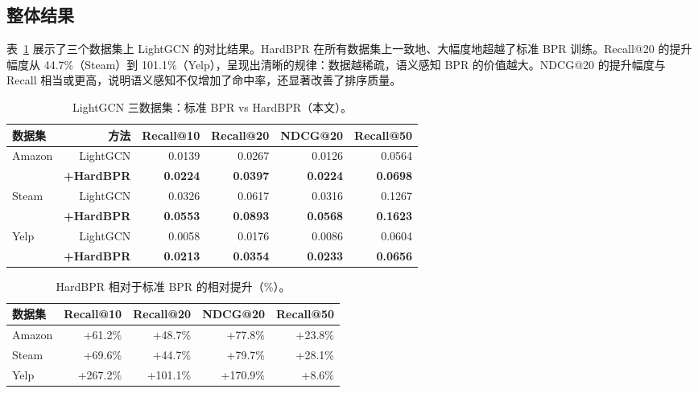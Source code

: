 \documentclass[11pt,a4paper]{article}
\begin{document}
\subsection{整体结果}

表~\ref{tab:main} 展示了三个数据集上 LightGCN 的对比结果。HardBPR 在所有数据集上一致地、大幅度地超越了标准 BPR 训练。Recall@20 的提升幅度从 44.7\%（Steam）到 101.1\%（Yelp），呈现出清晰的规律：数据越稀疏，语义感知 BPR 的价值越大。NDCG@20 的提升幅度与 Recall 相当或更高，说明语义感知不仅增加了命中率，还显著改善了排序质量。

\begin{table}[ht]
    \centering
    \caption{LightGCN 三数据集：标准 BPR vs HardBPR（本文）。}
    \label{tab:main}
    \begin{tabular}{lrrrrr}
        \toprule
        数据集 & 方法 & Recall@10 & Recall@20 & NDCG@20 & Recall@50 \\
        \midrule
        \multirow{2}{*}{Amazon}
        & LightGCN & 0.0139 & 0.0267 & 0.0126 & 0.0564 \\
        & \textbf{+HardBPR} & \textbf{0.0224} & \textbf{0.0397} & \textbf{0.0224} & \textbf{0.0698} \\
        \cmidrule(lr){2-6}
        \multirow{2}{*}{Steam}
        & LightGCN & 0.0326 & 0.0617 & 0.0316 & 0.1267 \\
        & \textbf{+HardBPR} & \textbf{0.0553} & \textbf{0.0893} & \textbf{0.0568} & \textbf{0.1623} \\
        \cmidrule(lr){2-6}
        \multirow{2}{*}{Yelp}
        & LightGCN & 0.0058 & 0.0176 & 0.0086 & 0.0604 \\
        & \textbf{+HardBPR} & \textbf{0.0213} & \textbf{0.0354} & \textbf{0.0233} & \textbf{0.0656} \\
        \bottomrule
    \end{tabular}
\end{table}

\begin{table}[ht]
    \centering
    \caption{HardBPR 相对于标准 BPR 的相对提升（\%）。}
    \label{tab:relative}
    \begin{tabular}{lrrrr}
        \toprule
        数据集 & Recall@10 & Recall@20 & NDCG@20 & Recall@50 \\
        \midrule
        Amazon & +61.2\% & +48.7\% & +77.8\% & +23.8\% \\
        Steam  & +69.6\% & +44.7\% & +79.7\% & +28.1\% \\
        Yelp   & +267.2\% & +101.1\% & +170.9\% & +8.6\% \\
        \bottomrule
    \end{tabular}
\end{table}
\end{document}
